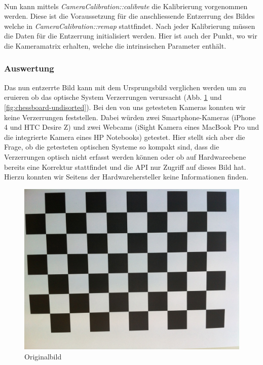 \documentclass[main.tex]{subfiles}
\begin{document}
\paragraph{} Nun kann mittels \textit{CameraCalibration::calibrate} die Kalibrierung vorgenommen werden. Diese ist die Voraussetzung für die anschliessende Entzerrung des Bildes welche in \textit{CameraCalibration::remap} stattfindet. Nach jeder Kalibrierung müssen die Daten für die Entzerrung initialisiert werden. Hier ist auch der Punkt, wo wir die Kameramatrix erhalten, welche die intrinsischen Parameter enthält.

\subsubsection{Auswertung} Das nun entzerrte Bild kann mit dem Ursprungsbild verglichen werden um zu eruieren ob das optische System Verzerrungen verursacht (Abb. \ref{fig:chessboard-disorted} und \ref{fig:chessboard-undisorted}). Bei den von uns getesteten Kameras konnten wir keine Verzerrungen feststellen. Dabei würden zwei Smartphone-Kameras (iPhone 4 und HTC Desire Z) und zwei Webcams (iSight Kamera eines MacBook Pro und die integrierte Kamera eines HP Notebooks) getestet. Hier stellt sich aber die Frage, ob die getesteten optischen Systeme so kompakt sind, dass die Verzerrungen optisch nicht erfasst werden können oder ob auf Hardwareebene bereits eine Korrektur stattfindet und die API nur Zugriff auf dieses Bild hat. Hierzu konnten wir Seitens der Hardwarehersteller keine Informationen finden.

\begin{figure}[!ht]
\centering
\includegraphics[scale=0.1]{images/chessboard-disorted.jpg} 
\caption{Originalbild}
\label{fig:chessboard-disorted}
\end{figure}
\end{document}
